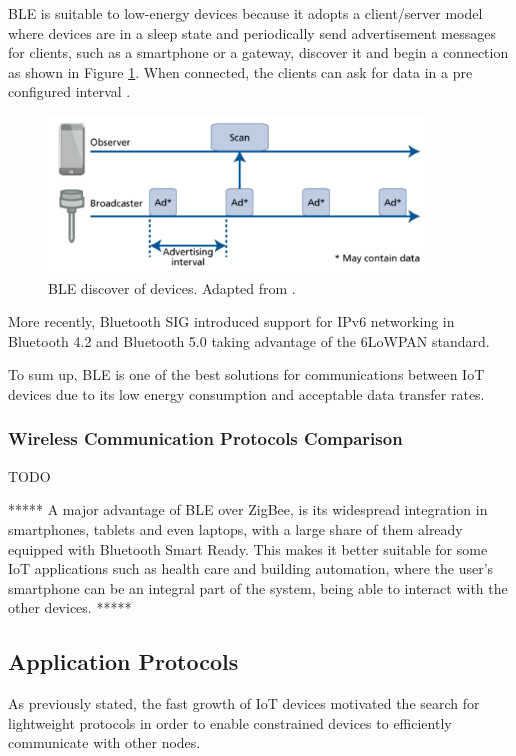 BLE is suitable to low-energy devices because it adopts a client/server model where devices are in a sleep state and periodically send advertisement messages for clients, such as a smartphone or a gateway, discover it and begin a connection as shown in Figure \ref{fig:ble2}. When connected, the clients can ask for data in a pre configured interval \cite{Andersson2014}. 

\begin{figure}[H]
	\centering
	\includegraphics[width=0.9\textwidth]{figures/ble2.png}
	\caption{BLE discover of devices. Adapted from \cite{Andersson2014}.}
	\label{fig:ble2}
\end{figure}

More recently, Bluetooth SIG introduced support for IPv6 networking in Bluetooth 4.2 and Bluetooth 5.0 taking advantage of the 6LoWPAN standard.

To sum up, BLE is one of the best solutions for communications between IoT devices due to its low energy consumption and acceptable data transfer rates.


\subsubsection{Wireless Communication Protocols Comparison}
TODO  


*****
A major advantage of BLE over ZigBee, is its widespread integration in smartphones, tablets and even laptops, with a large share of them already equipped with Bluetooth Smart Ready. This makes it better suitable for some IoT applications such as health care and building automation, where the user’s smartphone can be an integral part of the system, being able to interact with the other devices.
*****

\subsection{Application Protocols}

As previously stated, the fast growth of IoT devices motivated the search for lightweight protocols in order to enable constrained devices to efficiently communicate with other nodes.

